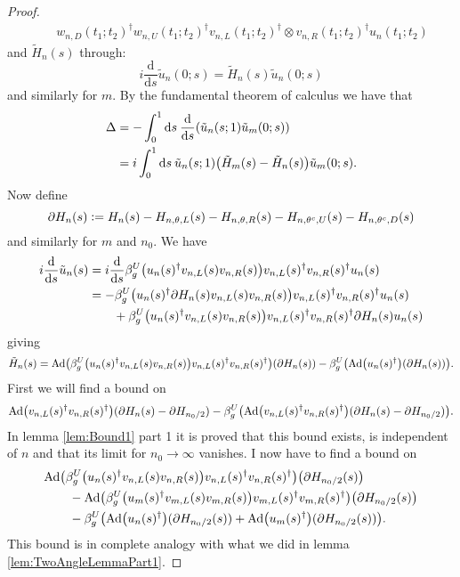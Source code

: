 \documentclass[12pt,a4paper,twoside]{article}
\renewcommand{\d}{\text{d}}
\newcommand{\defeq}{\vcentcolon=}
\let\originalleft\left
\let\originalright\right
\renewcommand{\left}{\mathopen{}\mathclose\bgroup\originalleft}
\renewcommand{\right}{\aftergroup\egroup\originalright}
\newcommand{\Ad}[1]{\textrm{Ad}\left(#1\right)}
\theoremstyle{definition}
\numberwithin{equation}{section}
\begin{document}
\begin{proof}
\begin{align}
 		\nonumber
 		&\quad w_{n,D}(t_1;t_2)^\dagger w_{n,U}(t_1;t_2)^\dagger v_{n,L}(t_1;t_2)^\dagger\otimes v_{n,R}(t_1;t_2)^\dagger u_{n}(t_1;t_2)
 	\end{align}
 	and $\tilde{H}_n(s)$ through:
 	\begin{equation}
 		i\frac{\d}{\d s}\tilde{u}_n(0;s)=\tilde{H}_n(s)\tilde{u}_n(0;s)
 	\end{equation}
 	and similarly for $m$. By the fundamental theorem of calculus we have that
 	\begin{align}
 		\Delta&=-\int_0^1\d s\:\frac{\d}{\d s}\left(\tilde{u}_n(s;1)\tilde{u}_m(0;s)\right)\\
 		&=i\int_0^1\d s \: \tilde{u}_n(s;1)\left(\tilde{H}_m(s)-\tilde{H}_n(s)\right)\tilde{u}_m(0;s).
 	\end{align}
 	Now define
 	\begin{equation}
 	\partial H_n(s)\defeq H_n(s)-H_{n,\theta,L}(s)-H_{n,\theta,R}(s)-H_{n,\theta^c,U}(s)-H_{n,\theta^c,D}(s)
 	\end{equation}
 	and similarly for $m$ and $n_0$. We have
 	\begin{align}
 	i\frac{\d}{\d s}\tilde{u}_n(s)&=i\frac{\d}{\d s}\beta_g^U\left(u_n(s)^\dagger v_{n,L}(s) v_{n,R}(s)\right)v_{n,L}(s)^\dagger v_{n,R}(s)^\dagger u_{n}(s)\\
 	&=-\beta_g^U\left(u_n(s)^\dagger \partial H_n(s) v_{n,L}(s) v_{n,R}(s)\right)v_{n,L}(s)^\dagger v_{n,R}(s)^\dagger u_{n}(s)\\
 	\nonumber
 	&\qquad +\beta_g^U\left(u_n(s)^\dagger v_{n,L}(s) v_{n,R}(s)\right)v_{n,L}(s)^\dagger v_{n,R}(s)^\dagger \partial H_n(s) u_{n}(s)
 	\end{align}
 	giving
 	\begin{equation}
 	\tilde{H}_n(s)=\Ad{\beta_g^U\left(u_n(s)^\dagger v_{n,L}(s) v_{n,R}(s)\right)v_{n,L}(s)^\dagger v_{n,R}(s)^\dagger}\left(\partial H_n(s)\right)-\beta_g^U\left(\Ad{u_n(s)^\dagger}(\partial H_n(s))\right).
 	\end{equation}
 	First we will find a bound on
 	\begin{equation}
 	\Ad{v_{n,L}(s)^\dagger v_{n,R}(s)^\dagger}(\partial H_n(s)-\partial H_{n_0/2})-\beta_g^U\left(\Ad{v_{n,L}(s)^\dagger v_{n,R}(s)^\dagger}(\partial H_n(s)-\partial H_{n_0/2})\right).
 	\end{equation}
 	In lemma \ref{lem:Bound1} part 1 it is proved that this bound exists, is independent of $n$ and that its limit for $n_0\rightarrow\infty$ vanishes. I now have to find a bound on
 	\begin{align}
 	&\Ad{\beta_g^U\left(u_n(s)^\dagger v_{n,L}(s) v_{n,R}(s)\right)v_{n,L}(s)^\dagger v_{n,R}(s)^\dagger}\left(\partial H_{n_0/2}(s)\right)\\
 	\nonumber
 	&\qquad-\Ad{\beta_g^U\left(u_m(s)^\dagger v_{m,L}(s) v_{m,R}(s)\right)v_{m,L}(s)^\dagger v_{m,R}(s)^\dagger}\left(\partial H_{n_0/2}(s)\right)\\
 	\nonumber
 	&\qquad -\beta_g^U\left(\Ad{u_n(s)^\dagger}(\partial H_{n_0/2}(s))+\Ad{u_m(s)^\dagger}(\partial H_{n_0/2}(s))\right).
 	\end{align}
 	{\color{red}This bound is in complete analogy with what we did in lemma \ref{lem:TwoAngleLemmaPart1}.}
 \end{proof}
\end{document}
